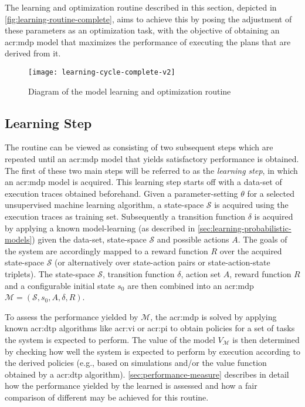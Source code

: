The learning and optimization routine described in this section, depicted in \autoref{fig:learning-routine-complete}, aims to achieve this by posing the adjustment of these parameters as an optimization task, with the objective of obtaining an \acrshort{acr:mdp} model that maximizes the performance of executing the plans that are derived from it.

\begin{figure}[!h]%
	\centering
	\texttt{[image: learning-cycle-complete-v2]}
	\caption{Diagram of the model learning and optimization routine}
	\label{fig:learning-routine-complete}
\end{figure}

\subsection{Learning Step}
\label{sec:routine-description}

The routine can be viewed as consisting of two subsequent steps which are repeated until an \acrshort{acr:mdp} model that yields satisfactory performance is obtained.
The first of these two main steps will be referred to as the \textit{learning step}, in which an \acrshort{acr:mdp} model is acquired.
This learning step starts off with a data-set of execution traces obtained beforehand.
Given a parameter-setting $\theta$ for a selected unsupervised machine learning algorithm, a state-space $\mathcal{S}$ is acquired using the execution traces as training set.
Subsequently a transition function $\delta$ is acquired by applying a known model-learning (as described in \autoref{sec:learning-probabilistic-models}) given the data-set, state-space $\mathcal{S}$ and possible actions $A$.
The goals of the system are accordingly mapped to a reward function $R$ over the acquired state-space $\mathcal{S}$ (or alternatively over state-action pairs or state-action-state triplets).
The state-space $\mathcal{S}$, transition function $\delta$, action set $A$, reward function $R$ and a configurable initial state $s_0$ are then combined into an \acrshort{acr:mdp} $\mathcal{M} = (\mathcal{S}, s_0, A, \delta, R)$.

To assess the performance yielded by $\mathcal{M}$, the \acrshort{acr:mdp} is solved by applying known \acrshort{acr:dtp} algorithms like \acrshort{acr:vi} or \acrshort{acr:pi} to obtain policies for a set of tasks the system is expected to perform.
The value of the model $V_{\mathcal{M}}$ is then determined by checking how well the system is expected to perform by execution according to the derived policies (e.g., based on simulations and/or the value function obtained by a \acrshort{acr:dtp} algorithm).
\autoref{sec:performance-measure} describes in detail how the performance yielded by the learned  is assessed and how a fair comparison of different  may be achieved for this routine.

